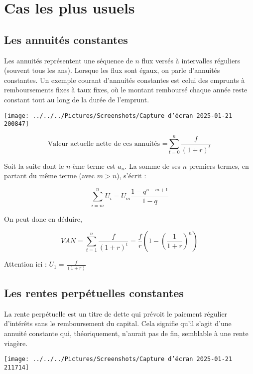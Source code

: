 \documentclass[a4paper, 12pt]{report}
\begin{document}
\section{Cas les plus usuels}

\subsection{Les annuités constantes}

Les annuités représentent une séquence de \( n \) flux versés à intervalles réguliers (souvent tous les ans). Lorsque les flux sont égaux, on parle d'annuités constantes. Un exemple courant d'annuités constantes est celui des emprunts à remboursements fixes à taux fixes, où le montant remboursé chaque année reste constant tout au long de la durée de l'emprunt.

\begin{center}
	\texttt{[image: ../../../Pictures/Screenshots/Capture d'écran 2025-01-21 200847]}
\end{center}

\[ \text{Valeur actuelle nette de ces annuités =}\sum_{t=0}^{n}\frac{f}{(1+r)^t}
 \]

Soit la suite dont le \( n \)-ème terme est \( a_n \). La somme de ses \( n \) premiers termes, en partant du même terme (avec \( m > n \)), s'écrit :

\[
\sum_{i=m}^{n} U_i = U_m \frac{1-q^{n-m+1}}{1-q}
\]

On peut donc en déduire,

\[ VAN = \sum_{t=1}^{n} \frac{f}{(1+r)^t}=\frac{f}{r}\left( 1-\left( \frac{1}{1+r}\right) ^n\right)   \]

Attention ici : \( U_1=\frac{f}{(1+r)} \)

\subsection{Les rentes perpétuelles constantes}

La rente perpétuelle est un titre de dette qui prévoit le paiement régulier d'intérêts sans le remboursement du capital. Cela signifie qu'il s'agit d'une annuité constante qui, théoriquement, n'aurait pas de fin, semblable à une rente viagère.

\begin{center}
	\texttt{[image: ../../../Pictures/Screenshots/Capture d'écran 2025-01-21 211714]}
\end{center}
\end{document}
